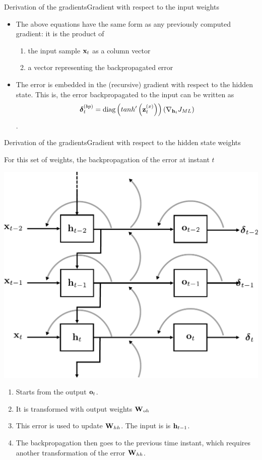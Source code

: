 \documentclass{beamer}
\begin{document}
\begin{frame}{Derivation of the gradients}{Gradient with respect to the input weights}
\begin{itemize}
    \item The above equations have the  same form as any previously computed gradient: it is the product of
    \begin{enumerate}
    \item  the input sample ${\bf x}_t$ as a column vector 
    \item a vector representing the backpropagated error
    \end{enumerate}
    \item The error is embedded in the (recursive) gradient with respect to the hidden state. This is, the error backpropagated to the input can be written as 
    $${\boldsymbol \delta}_t^{(bp)} = \text{diag}\left( tanh'\left({\bf z}^{(x)}_t\right) \right) \left(\nabla_{{\bf h}_t} J_{ML}\right)$$.
\end{itemize}
\end{frame}

\begin{frame}{Derivation of the gradients}{Gradient with respect to the hidden state weights}

For this set of weights, the backpropagation of the error at instant $t$

\begin{multicols}{2}
\includegraphics[scale=0.35]{Module 5 (RNN)/pics/smaller_rnn_unrolled_BP.pdf}
\columnbreak

    \begin{enumerate}
        \item Starts from the output ${\bf o}_t$.
        \item It is transformed with output weights ${\bf W}_{oh}$
        \item This error is used to update ${\bf W}_{hh}$. The input is is ${\bf h}_{t-1}$. 
        \item The backpropagation  then goes to the previous time instant, which requires another transformation of the error ${\bf W}_{hh}$. 

    \end{enumerate}
\end{multicols}
\end{frame}
\end{document}
